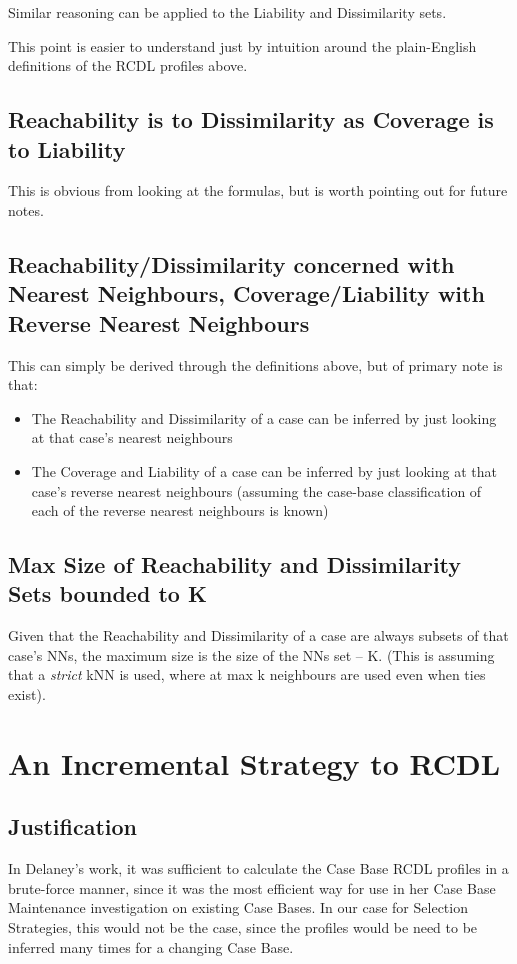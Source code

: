 \documentclass[a4paper,11pt]{report}
\begin{document}
Similar reasoning can be applied to the Liability and Dissimilarity sets.

This point is easier to understand just by intuition around the plain-English definitions of the RCDL profiles above.

\subsection{Reachability is to Dissimilarity as Coverage is to Liability}
This is obvious from looking at the formulas, but is worth pointing out for future notes.

\subsection{Reachability/Dissimilarity concerned with Nearest Neighbours, Coverage/Liability with Reverse Nearest Neighbours \label{sec:RdWithNnClWithRnn}}
This can simply be derived through the definitions above, but of primary note is that:
\begin{itemize}
	\item The Reachability and Dissimilarity of a case can be inferred by just looking at that case's nearest neighbours
	\item The Coverage and Liability of a case can be inferred by just looking at that case's reverse nearest neighbours (assuming the case-base classification of each of the reverse nearest neighbours is known)
\end{itemize}

\subsection{Max Size of Reachability and Dissimilarity Sets bounded to K}
Given that the Reachability and Dissimilarity of a case are always subsets of that case's NNs, the maximum size is the size of the NNs set – K. (This is assuming that a \emph{strict} kNN is used, where at max k neighbours are used even when ties exist).

\section{An Incremental Strategy to RCDL}
\subsection{Justification} 
In Delaney's work, it was sufficient to calculate the Case Base RCDL profiles in a brute-force manner, since it was the most efficient way for use in her Case Base Maintenance investigation on existing Case Bases. In our case for Selection Strategies, this would not be the case, since the profiles would be need to be inferred many times for a changing Case Base.
\end{document}
